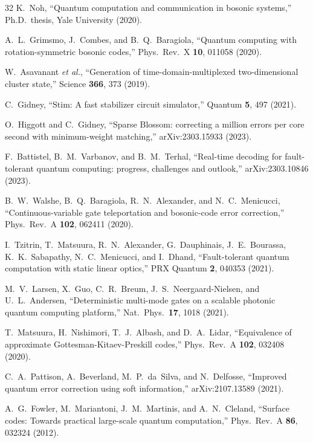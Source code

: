 \documentclass[twocolumn,showpacs,preprintnumbers,amsmath,amssymb,superscriptaddress]{revtex4-2}
\begin{document}
\begin{thebibliography}{32}
K.~Noh,
``Quantum computation and communication in bosonic systems,''
Ph.D.\ thesis, Yale University (2020).

A.~L.~Grimsmo, J.~Combes, and B.~Q.~Baragiola,
``Quantum computing with rotation-symmetric bosonic codes,''
Phys.\ Rev.\ X \textbf{10}, 011058 (2020).

W.~Asavanant \emph{et al.},
``Generation of time-domain-multiplexed two-dimensional cluster state,''
Science \textbf{366}, 373 (2019).

C.~Gidney,
``Stim: A fast stabilizer circuit simulator,''
Quantum \textbf{5}, 497 (2021).

O.~Higgott and C.~Gidney,
``Sparse Blossom: correcting a million errors per core second with minimum-weight matching,''
arXiv:2303.15933 (2023).

F.~Battistel, B.~M.~Varbanov, and B.~M.~Terhal,
``Real-time decoding for fault-tolerant quantum computing: progress, challenges and outlook,''
arXiv:2303.10846 (2023).

B.~W.~Walshe, B.~Q.~Baragiola, R.~N.~Alexander, and N.~C.~Menicucci,
``Continuous-variable gate teleportation and bosonic-code error correction,''
Phys.\ Rev.\ A \textbf{102}, 062411 (2020).

I.~Tzitrin, T.~Matsuura, R.~N.~Alexander, G.~Dauphinais, J.~E.~Bourassa, K.~K.~Sabapathy, N.~C.~Menicucci, and I.~Dhand,
``Fault-tolerant quantum computation with static linear optics,''
PRX Quantum \textbf{2}, 040353 (2021).

M.~V.~Larsen, X.~Guo, C.~R.~Breum, J.~S.~Neergaard-Nielsen, and U.~L.~Andersen,
``Deterministic multi-mode gates on a scalable photonic quantum computing platform,''
Nat.\ Phys.\ \textbf{17}, 1018 (2021).

T.~Matsuura, H.~Nishimori, T.~J.~Albash, and D.~A.~Lidar,
``Equivalence of approximate Gottesman-Kitaev-Preskill codes,''
Phys.\ Rev.\ A \textbf{102}, 032408 (2020).

C.~A.~Pattison, A.~Beverland, M.~P.~da~Silva, and N.~Delfosse,
``Improved quantum error correction using soft information,''
arXiv:2107.13589 (2021).

A.~G.~Fowler, M.~Mariantoni, J.~M.~Martinis, and A.~N.~Cleland,
``Surface codes: Towards practical large-scale quantum computation,''
Phys.\ Rev.\ A \textbf{86}, 032324 (2012).


\end{thebibliography}
\end{document}
